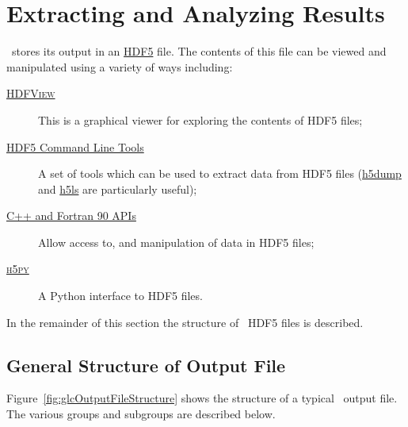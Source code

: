 \chapter{Extracting and Analyzing Results}

\glc\ stores its output in an \href{http://www.hdfgroup.org/HDF5/}{HDF5} file. The contents of this file can be viewed and manipulated using a variety of ways including:
\begin{description}
 \item[\href{http://www.hdfgroup.org/hdf-java-html/hdfview/}{{\normalfont \scshape HDFView}}] This is a graphical viewer for exploring the contents of HDF5 files;
 \item[\href{http://www.hdfgroup.org/products/hdf5_tools/index.html\#h5dist}{HDF5 Command Line Tools}] A set of tools which can be used to extract data from HDF5 files (\href{http://www.hdfgroup.org/HDF5/doc/RM/Tools.html#Tools-Dump}{{\normalfont \ttfamily h5dump}} and \href{http://www.hdfgroup.org/HDF5/doc/RM/Tools.html#Tools-Ls}{{\normalfont \ttfamily h5ls}} are particularly useful);
 \item[\href{http://www.hdfgroup.org/HDF5/doc/RM/RM_H5Front.html\#F90andCPPlus}{C++ and Fortran 90 APIs}] Allow access to, and manipulation of data in HDF5 files;
 \item[\href{http://code.google.com/p/h5py/}{{\normalfont \scshape h5py}}] A Python interface to HDF5 files.
\end{description}

In the remainder of this section the structure of \glc\ HDF5 files is described.

\section{General Structure of Output File}

Figure~\ref{fig:glcOutputFileStructure} shows the structure of a typical \glc\ output file. The various groups and subgroups are described below.

